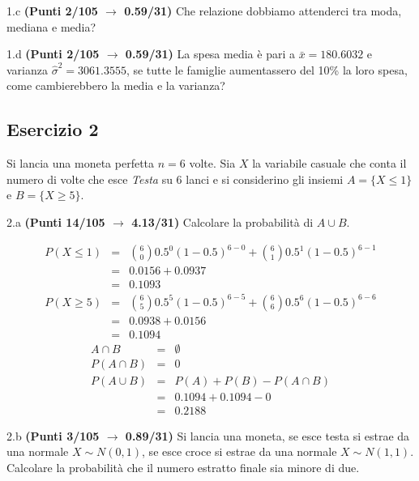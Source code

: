 \documentclass[
  11pt,
]{book}
\theoremstyle{mytheoremstyle}
\theoremstyle{mydefstyle}
\newenvironment{sol}
  {
  \begin{tcolorbox}[enhanced,breakable,arc=0.1mm,boxrule=1pt,colback=white,colframe=iblue,
  title=\bf \fontfamily{lmss}\selectfont \hspace{.5 cm} Soluzione,drop fuzzy shadow]

}{
\end{tcolorbox}
  }
\begin{document}
1.c \textbf{(Punti 2/105 \(\rightarrow\) 0.59/31)} Che relazione dobbiamo attenderci tra moda, mediana e media?

1.d \textbf{(Punti 2/105 \(\rightarrow\) 0.59/31)} La spesa media è pari a \(\bar x=180.6032\) e varianza \(\hat\sigma^2=3061.3555\), se tutte le famiglie aumentassero
del 10\% la loro spesa, come cambierebbero la media e la varianza?

\subsection{Esercizio 2}\label{esercizio-2-30}

Si lancia una moneta perfetta \(n=6\) volte. Sia \(X\) la variabile casuale che conta
il numero di volte che esce \emph{Testa} su 6 lanci e si considerino gli insiemi \(A=\{X\le 1\}\) e \(B=\{X\ge 5\}\).

2.a \textbf{(Punti 14/105 \(\rightarrow\) 4.13/31)} Calcolare la probabilità di \(A\cup B\).

\begin{sol}
\normalsize 
\begin{eqnarray*}
      P( X \leq 1 ) &=& \binom{ 6 }{ 0 } 0.5 ^{ 0 }(1- 0.5 )^{ 6 - 0 }+\binom{ 6 }{ 1 } 0.5 ^{ 1 }(1- 0.5 )^{ 6 - 1 } \\                 &=& 0.0156+0.0937 \\                 &=& 0.1093 
   \end{eqnarray*}
\normalsize  \normalsize 
\begin{eqnarray*}
      P( X \geq 5 ) &=& \binom{ 6 }{ 5 } 0.5 ^{ 5 }(1- 0.5 )^{ 6 - 5 }+\binom{ 6 }{ 6 } 0.5 ^{ 6 }(1- 0.5 )^{ 6 - 6 } \\                 &=& 0.0938+0.0156 \\                 &=& 0.1094 
   \end{eqnarray*}
\normalsize 
\begin{eqnarray*}
A\cap B &=& \emptyset\\
P(A\cap B) &=& 0\\
  P(A\cup B) &=&  P(A)+P(B)-P(A\cap B)\\
  &=& 0.1094+0.1094-0\\
  &=& 0.2188
\end{eqnarray*}

\end{sol}

2.b \textbf{(Punti 3/105 \(\rightarrow\) 0.89/31)} Si lancia una moneta, se esce testa si estrae da una normale \(X\sim N(0,1)\), se esce croce si estrae
da una normale \(X\sim N(1,1)\). Calcolare la probabilità che il numero estratto finale sia minore di due.
\end{document}
